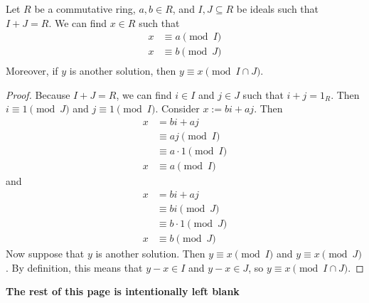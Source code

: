 \documentclass [12pt] {article}
\newenvironment{theorem}[1]{\begin{tcolorbox}[title={Theorem #1},colback=green!5!white,colframe=black!75!green]}{\end{tcolorbox}}
\renewcommand{\bf}[1]{\textbf{{#1}}}
\begin{document}
\newpage
\begin{theorem}{(Chinese Remainder Theorem (Rings))}
    \label{thm:crtrings}
    Let $R$ be a commutative ring, $a, b \in R$, and $I, J \subseteq R$ be ideals such that 
    $I + J = R$. We can find $x \in R$ such that
    \begin{align*}
        x &\equiv a \pmod{I} \\
        x &\equiv b \pmod{J} \\
    \end{align*}
    Moreover, if $y$ is another solution, then $y \equiv x \pmod{I \cap J}$.
\end{theorem}
\begin{proof}
    Because $I + J = R$, we can find $i \in I$ and $j \in J$ such that $i + j = 1_R$. Then
    $i \equiv 1 \pmod{J}$ and $j \equiv 1 \pmod{I}$. Consider $x := bi + aj$. Then
    \begin{align*}
        x &= bi + aj \\ 
          &\equiv aj \pmod{I} \\ 
          &\equiv a \cdot 1 \pmod{I} \\ 
        x &\equiv a \pmod{I}
    \end{align*}
    and
    \begin{align*}
        x &= bi + aj \\ 
          &\equiv bi \pmod{J} \\ 
          &\equiv b \cdot 1 \pmod{J} \\ 
        x &\equiv b \pmod{J}
    \end{align*}
    Now suppose that $y$ is another solution. Then $y \equiv x \pmod{I}$ and $y \equiv x \pmod{J}$.
    By definition, this means that $y - x \in I$ and $y - x \in J$, so $y \equiv x \pmod{I \cap J}$.
\end{proof}

\begin{center}
    \vspace{5em}
    \bf{The rest of this page is intentionally left blank}
\end{center}
\end{document}

